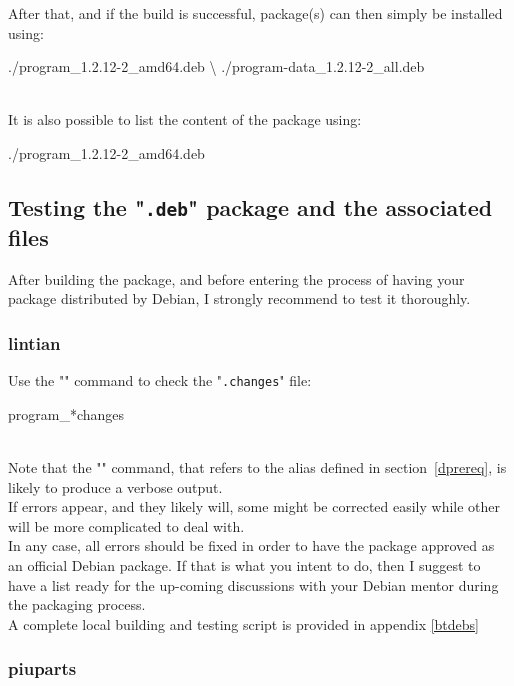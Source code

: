 After that, and if the build is successful, package(s) can then simply be installed using:
\begin{script}
\uprompt{~}    ./program\_1.2.12-2\_amd64.deb \textbackslash 
                                        ./program-data\_1.2.12-2\_all.deb
\end{script}
\\[-0.5cm]
\noindent It is also possible to list the content of the package using:
\begin{script}
\uprompt{~}   ./program\_1.2.12-2\_amd64.deb
\end{script}

\subsection{Testing the "\texttt{.deb}" package and the associated files}
\label{debtesting}
After building the package, and before entering the process of having your package distributed by Debian, I strongly recommend to test it thoroughly. 

\subsubsection{lintian}
Use the "" command to check the "\texttt{.changes}" file: 
\begin{script}
\uprompt{~}  program\_*changes 
\end{script}
\\[-0.75cm]
\noindent Note that the "" command, that refers to the alias defined in section~\ref{dprereq}, 
is likely to produce a verbose output. \\  
If errors appear, and they likely will, some might be corrected easily while other will be more complicated to deal with. \\
In any case, all errors should be fixed in order to have the package approved as an official Debian package. 
If that is what you intent to do, then I suggest to have a list ready for the up-coming discussions with your Debian mentor during the packaging process. \\[0.25cm]
A complete local building and testing script is provided in appendix \ref{btdebs}

\subsubsection{piuparts}

